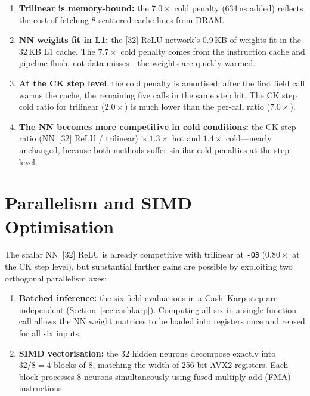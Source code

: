 \documentclass[11pt,a4paper]{article}
\begin{document}
\begin{enumerate}
    \item \textbf{Trilinear is memory-bound:} the $7.0\times$ cold
          penalty (634\,ns added) reflects the cost of fetching 8
          scattered cache lines from DRAM.

    \item \textbf{NN weights fit in L1:} the [32] ReLU network's
          0.9\,KB of weights fit in the 32\,KB L1 cache.  The
          $7.7\times$ cold penalty comes from the instruction cache
          and pipeline flush, not data misses---the weights are
          quickly warmed.

    \item \textbf{At the CK step level}, the cold penalty is
          amortised: after the first field call warms the cache, the
          remaining five calls in the same step hit.  The CK step cold
          ratio for trilinear ($2.0\times$) is much lower than the
          per-call ratio ($7.0\times$).

    \item \textbf{The NN becomes more competitive in cold conditions:}
          the CK step ratio (NN~[32] ReLU / trilinear) is $1.3\times$
          hot and $1.4\times$ cold---nearly unchanged, because both
          methods suffer similar cold penalties at the step level.
\end{enumerate}


\section{Parallelism and SIMD Optimisation}
\label{sec:optimisation}

The scalar NN~[32] ReLU is already competitive with trilinear at
\texttt{-O3} ($0.80\times$ at the CK step level), but substantial
further gains are possible by exploiting two orthogonal parallelism
axes:

\begin{enumerate}
    \item \textbf{Batched inference:} the six field evaluations in a
          Cash--Karp step are independent (Section~\ref{sec:cashkarp}).
          Computing all six in a single function call allows the NN
          weight matrices to be loaded into registers once and reused
          for all six inputs.

    \item \textbf{SIMD vectorisation:} the 32 hidden neurons
          decompose exactly into $32/8 = 4$ blocks of 8, matching the
          width of 256-bit AVX2 registers.  Each block processes 8
          neurons simultaneously using fused multiply-add (FMA)
          instructions.
\end{enumerate}
\end{document}
